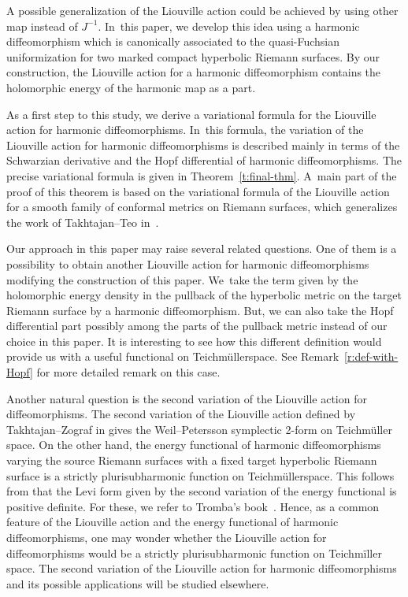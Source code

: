 \documentclass[pdftex]{sigma}%
\numberwithin{equation}{section}
\newcommand{\Te}{Teichm\"{u}ller\:}
\begin{document}
A possible generalization of the Liouville action could be achieved by using other map instead of $J^{-1}$. In~this paper, we develop this idea using a harmonic diffeomorphism which is canonically associated to the quasi-Fuchsian uniformization
for two marked compact hyperbolic Riemann surfaces.
By our construction, the Liouville action for a harmonic diffeomorphism contains the holomorphic energy of the harmonic map as a part.

As a first step to this study, we derive a variational formula for the Liouville action for harmonic diffeomorphisms. In~this formula, the variation of the Liouville action for harmonic diffeomorphisms is described mainly in terms of the Schwarzian derivative and the Hopf differential of harmonic diffeomorphisms. The precise variational formula is given in Theorem~\ref{t:final-thm}.
A~main part of the proof of this theorem is based on the variational formula of the Liouville action for a smooth family of conformal metrics on Riemann surfaces, which generalizes the work of Takhtajan--Teo in~\cite{2}.

Our approach in this paper may raise several related questions. One of them is a possibility to obtain another Liouville action for harmonic diffeomorphisms modifying the construction of this paper. We~take the term given by the holomorphic energy density in the pullback of the hyperbolic metric on the target Riemann surface by a harmonic diffeomorphism. But, we can also take
the Hopf differential part possibly among the parts of the pullback metric instead of our choice in this paper.
It is interesting to see how this different definition would provide us with a useful functional on \Te space.
See Remark~\ref{r:def-with-Hopf} for more detailed remark on this case.

Another natural question is the second variation of the Liouville action for diffeomorphisms. The second variation of the Liouville action defined by Takhtajan--Zograf in \cite{TZ88-1, TZ88-2} gives
the Weil--Petersson symplectic 2-form on Teichm\"uller space. On the other hand, the energy functional of harmonic diffeomorphisms varying the source Riemann surfaces with a fixed target hyperbolic Riemann surface is a strictly plurisubharmonic function on \Te space. This follows from that the Levi form given by the second variation of the energy functional is positive definite. For these, we refer to Tromba's book~\cite{Tromba}. Hence, as a common feature of the Liouville action and the energy functional of harmonic diffeomorphisms, one may wonder whether the Liouville action for diffeomorphisms would be a strictly plurisubharmonic function on Teich\-m\"iller space. The second variation of the Liouville action for harmonic diffeomorphisms and its possible applications will be studied elsewhere.
\end{document}

